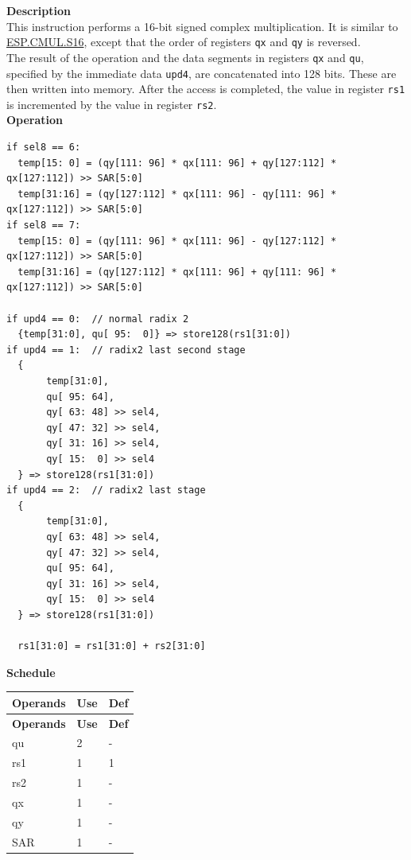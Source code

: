 \textbf{Description}\\
This instruction performs a 16-bit signed complex multiplication. It is similar to \hyperref[instruction:ESPCMULS16]{ESP.CMUL.S16}, except that the order of registers \lstinline{qx} and \lstinline{qy} is reversed.\\
The result of the operation and the data segments in registers \lstinline{qx} and \lstinline{qu}, specified by the immediate data \lstinline{upd4}, are concatenated into 128 bits. These are then written into memory. After the access is completed, the value in register \lstinline{rs1} is incremented by the value in register \lstinline{rs2}.\\
\textbf{Operation}
\begin{lstlisting}
if sel8 == 6:
  temp[15: 0] = (qy[111: 96] * qx[111: 96] + qy[127:112] * qx[127:112]) >> SAR[5:0]
  temp[31:16] = (qy[127:112] * qx[111: 96] - qy[111: 96] * qx[127:112]) >> SAR[5:0]
if sel8 == 7:
  temp[15: 0] = (qy[111: 96] * qx[111: 96] - qy[127:112] * qx[127:112]) >> SAR[5:0]
  temp[31:16] = (qy[127:112] * qx[111: 96] + qy[111: 96] * qx[127:112]) >> SAR[5:0]

if upd4 == 0:  // normal radix 2
  {temp[31:0], qu[ 95:  0]} => store128(rs1[31:0])
if upd4 == 1:  // radix2 last second stage
  {
       temp[31:0],
       qu[ 95: 64],
       qy[ 63: 48] >> sel4,
       qy[ 47: 32] >> sel4,
       qy[ 31: 16] >> sel4,
       qy[ 15:  0] >> sel4
  } => store128(rs1[31:0])
if upd4 == 2:  // radix2 last stage
  {
       temp[31:0],
       qy[ 63: 48] >> sel4,
       qy[ 47: 32] >> sel4,
       qu[ 95: 64],
       qy[ 31: 16] >> sel4,
       qy[ 15:  0] >> sel4
  } => store128(rs1[31:0])

  rs1[31:0] = rs1[31:0] + rs2[31:0]
\end{lstlisting}

\textbf{Schedule}\\
\begin{longtable}[c]{|l|l|l|}
    \hline
    \rowcolor{lightgray}
    \textbf{Operands} & \textbf{Use} & \textbf{Def} \\\hline
    \endfirsthead
    \hline
    \rowcolor{lightgray}
     \textbf{Operands} & \textbf{Use} & \textbf{Def} \\\hline
    \endhead
    \hline
    \endfoot

  qu & 2 & - \\\hline
  rs1 & 1 & 1 \\\hline
  rs2 & 1 & - \\\hline
  qx & 1 & - \\\hline
  qy & 1 & - \\\hline
  SAR & 1 & -

\end{longtable}

